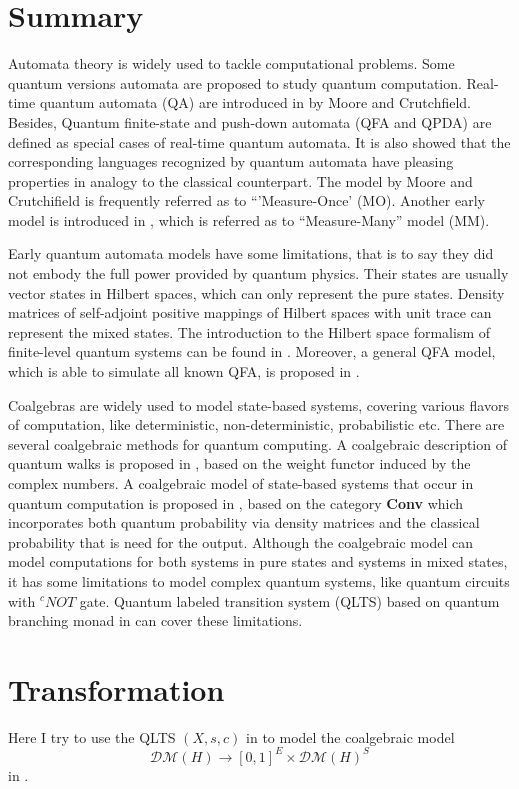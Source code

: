 \documentclass{llncs}
\begin{document}
\section{Summary}
Automata theory is widely used to tackle computational problems. Some quantum versions automata are proposed to study quantum computation. Real-time quantum automata (QA) are introduced in \cite{CJ00} by Moore and Crutchfield. Besides, Quantum finite-state and push-down automata (QFA and QPDA) are defined as special cases of real-time quantum automata. It is also showed that the corresponding languages recognized by quantum automata have pleasing properties in analogy to the classical counterpart. The model by Moore and Crutchifield is frequently referred as to ``'Measure-Once' (MO). Another early model is introduced in \cite{AJ97}, which is referred as to ``Measure-Many'' model (MM).

Early quantum automata models have some limitations, that is to say they did not embody the full power provided by quantum physics. Their states are usually vector states in Hilbert spaces, which can only represent the pure states. Density matrices of self-adjoint positive mappings of Hilbert spaces with unit trace can represent the mixed states. The introduction to the Hilbert space formalism of finite-level quantum systems can be found in \cite{M11}. Moreover, a general QFA model, which is able to simulate all known QFA, is proposed in \cite{AA14}.

Coalgebras are widely used to model state-based systems, covering various flavors of computation, like deterministic, non-deterministic, probabilistic etc. There are several coalgebraic methods for quantum computing. A coalgebraic description of quantum walks is proposed in \cite{B11}, based on the weight functor induced by the complex numbers. A coalgebraic model of state-based systems that occur in quantum computation is proposed in \cite{F12}, based on the category \textbf{Conv} which incorporates both quantum probability via density matrices and the classical probability that is need for the output. Although the coalgebraic model can model computations for both systems in pure states and systems in mixed states, it has some limitations to model complex quantum systems, like quantum circuits with $^cNOT$ gate. Quantum labeled transition system (QLTS) based on quantum branching monad in \cite{H14} can cover these limitations. 

\section{Transformation}
Here I try to use the QLTS $(X,s,c)$ in \cite{H14} to model the coalgebraic model $$\mathcal{DM}(H)\rightarrow [0,1]^{E}\times \mathcal{DM}(H)^{S}$$ in \cite{F12}.
\end{document}
